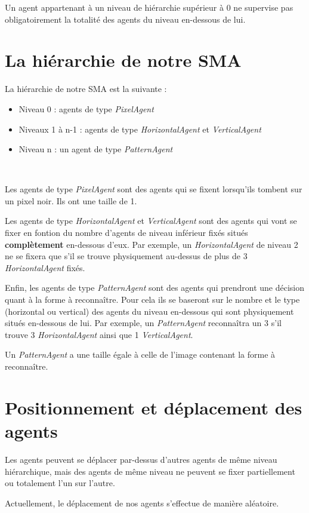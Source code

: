 \documentclass[a4paper,12pt]{report}
\begin{document}
Un agent appartenant à un niveau de hiérarchie supérieur à 0 ne supervise pas obligatoirement la totalité des agents du niveau en-dessous de lui.

\section{La hiérarchie de notre SMA}
La hiérarchie de notre SMA est la suivante :
\begin{itemize}
 \item Niveau 0 : agents de type \emph{PixelAgent}
 \item Niveaux 1 à n-1 : agents de type \emph{HorizontalAgent} et \emph{VerticalAgent}
 \item Niveau n : un agent de type \emph{PatternAgent}
\end{itemize}

~

Les agents de type \emph{PixelAgent} sont des agents qui se fixent lorsqu'ils tom\-bent sur un pixel noir. Ils ont une taille de 1.

Les agents de type \emph{HorizontalAgent} et \emph{VerticalAgent} sont des agents qui vont se fixer en fontion du nombre d'agents de niveau inférieur fixés situés \textbf{complètement} en-dessous d'eux. Par exemple, un \emph{HorizontalAgent} de niveau 2 ne se fixera que s'il se trouve physiquement au-dessus de plus de 3 \emph{HorizontalAgent} fixés.

Enfin, les agents de type \emph{PatternAgent} sont des agents qui prendront une décision quant à la forme à reconnaître. Pour cela ils se baseront sur le nombre et le type (horizontal ou vertical) des agents du niveau en-dessous qui sont physiquement situés en-dessous de lui. Par exemple, un \emph{PatternAgent} reconnaîtra un 3 s'il trouve 3 \emph{HorizontalAgent} ainsi que 1 \emph{VerticalAgent}. 

Un \emph{PatternAgent} a une taille égale à celle de l'image contenant la forme à reconnaître. 

\section{Positionnement et déplacement des agents}
Les agents peuvent se déplacer par-dessus d'autres agents de même niveau hiérarchique, mais des agents de même niveau ne peuvent se fixer partiellement ou totalement l'un sur l'autre.

Actuellement, le déplacement de nos agents s'effectue de manière aléatoire.
\end{document}
